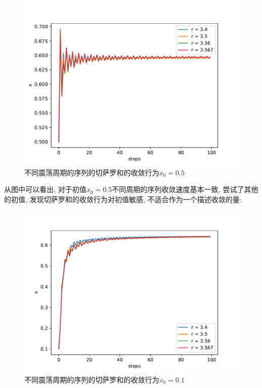 \documentclass[a4paper,zihao=5,UTF8]{ctexart}
\begin{document}
    \begin{figure}[htbp]
        \centering 
        \includegraphics[scale=0.5]{6_cesaro_compare.pdf}
        \caption{不同震荡周期的序列的切萨罗和的收敛行为$x_0=0.5$}
    \end{figure}
    \par 
    从图中可以看出, 对于初值$x_0=0.5$不同周期的序列收敛速度基本一致, 尝试了其他的初值, 
    发现切萨罗和的收敛行为对初值敏感, 不适合作为一个描述收敛的量:
    \begin{figure}[htbp]
        \centering
        \includegraphics[scale=0.5]{6_cesaro_compare_another.pdf}
        \caption{不同震荡周期的序列的切萨罗和的收敛行为$x_0=0.1$}
    \end{figure}
\end{document}
